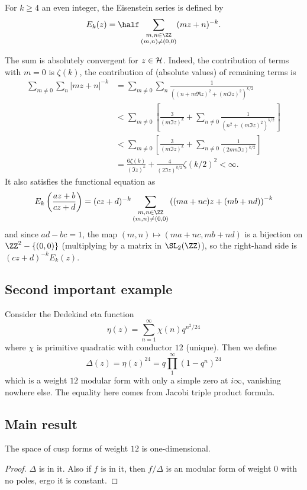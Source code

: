 \begin{definition}
  For $k \ge 4$ an even integer,
  the \alert{Eisenstein series} is defined by
  \[ E_k(z) = \half
    \sum_{\substack{m,n \in \ZZ \\ (m,n) \ne (0,0)}} (mz+n)^{-k}. \]
\end{definition}
The sum is absolutely convergent for $z \in \mathcal H$.
Indeed, the contribution of terms with $m=0$ is $\zeta(k)$,
the contribution of (absolute values) of remaining terms is
\begin{align*} \sum_{m \ne 0} \sum_{n}
  \left\lvert mz+n \right\rvert^{-k}
  &= \sum_{m \ne 0} \sum_{n}
  \frac{1}{\left( (n + m \Re z)^2 + (m \Im z)^2 \right)^{k/2}} \\
  &< \sum_{m \ne 0} \left[
    \frac{3}{(m \Im z)^k}
    + \sum_{n \ne 0} \frac{1}{\left( n^2 + (m \Im z)^2 \right)^{k/2}} \right] \\
  &< \sum_{m \ne 0} \left[
    \frac{3}{(m \Im z)^k}
    + \sum_{n \ne 0} \frac{1}{(2mn \Im z)^{k/2}} \right] \\
  &= \frac{6\zeta(k)}{(\Im z)^k}
  + \frac{4}{(2\Im z)^{k/2}} \zeta(k/2)^2 < \infty.
\end{align*}
It also satisfies the functional equation as
\[ E_k\left( \frac{az+b}{cz+d} \right)
  = (cz+d)^{-k}
  \sum_{\substack{m,n \in \ZZ \\ (m,n) \ne (0,0)}}
  \left( (ma+nc)z + (mb+nd)  \right)^{-k}
\]
and since $ad-bc=1$,
the map $(m,n) \mapsto (ma+nc,mb+nd)$ is a bijection on $\ZZ^2 - \{(0,0)\}$
(multiplying by a matrix in $\SL_2(\ZZ)$),
so the right-hand side is $(cz+d)^{-k} E_k(z)$.




\subsection{Second important example}
Consider the Dedekind eta function
\[ \eta(z) = \sum_{n=1}^\infty \chi(n) q^{n^2/24} \]
where $\chi$ is primitive quadratic with conductor $12$ (unique).
Then we define
\[ \Delta(z) = \eta(z)^{24} = q \prod_1^\infty (1-q^n)^{24} \]
which is a weight $12$ modular form with only a simple zero at $i\infty$,
vanishing nowhere else.
The equality here comes from Jacobi triple product formula.

\subsection{Main result}
\begin{proposition}
  The space of cusp forms of weight $12$ is one-dimensional.
\end{proposition}
\begin{proof}
  $\Delta$ is in it.
  Also if $f$ is in it,
  then $f/\Delta$ is an modular form of weight $0$ with no poles,
  ergo it is constant.
\end{proof}

